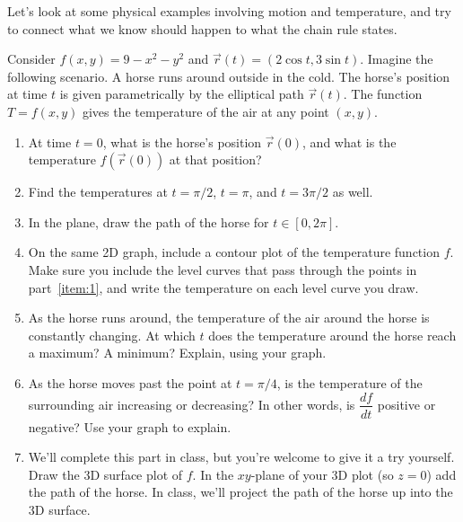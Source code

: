 Let's look at some physical examples involving motion and temperature, and try to connect what we know should happen to what the chain rule states.


\begin{problem}\label{prob:horse track chain}
 Consider $f(x,y)=9-x^2-y^2$ and $\vec r(t)=(2\cos t, 3\sin t)$. Imagine the following scenario.  A horse runs around outside in the cold. The horse's position at time $t$ is given parametrically by the elliptical path $\vec r(t)$. The function $T=f(x,y)$ gives the temperature of the air at any point $(x,y)$.  
\begin{enumerate}
	\item\label{item:1} At time $t=0$, what is the horse's position $\vec r(0)$, and what is the temperature $f(\vec r(0))$ at that position? 
	\item Find the temperatures at $t=\pi/2$, $t=\pi$, and $t=3\pi/2$ as well. 
	\item In the plane, draw the path of the horse for $t\in [0,2\pi]$. 
	\item On the same 2D graph, include a contour plot of the temperature function $f$. Make sure you include the level curves that pass through the points in part~\ref{item:1}, and write the temperature on each level curve you draw. 
	
 \item As the horse runs around, the temperature of the air around the horse is constantly changing. 
At which $t$ does the temperature around the horse reach a maximum?  A minimum?  Explain, using your graph. 
%
 \item\label{item:2} As the horse moves past the point at $t=\pi/4$, is the temperature of the surrounding air increasing or decreasing? In other words, is $\dfrac{df}{dt}$ positive or negative? Use your graph to explain.
 \item We'll complete this part in class, but you're welcome to give it a try yourself. %
Draw the 3D surface plot of $f$. In the $xy$-plane of your 3D plot (so $z=0$) add the path of the horse. In class, we'll project the path of the horse up into the 3D surface. 
\end{enumerate}
\end{problem}

